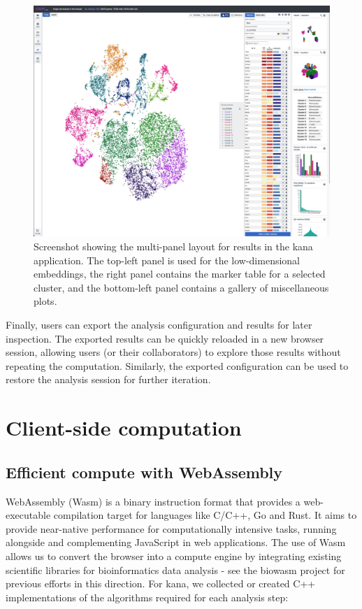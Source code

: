 \documentclass{article}
\begin{document}
\begin{figure}[htbp]
\begin{center}
\includegraphics[width=\textwidth]{screenshots/results.png}
\end{center}
\caption{Screenshot showing the multi-panel layout for results in the kana application.
The top-left panel is used for the low-dimensional embeddings,
the right panel contains the marker table for a selected cluster,
and the bottom-left panel contains a gallery of miscellaneous plots.}
\label{screenshot:results}
\end{figure}

Finally, users can export the analysis configuration and results for later inspection.
The exported results can be quickly reloaded in a new browser session, allowing users (or their collaborators) to explore those results without repeating the computation.
Similarly, the exported configuration can be used to restore the analysis session for further iteration.

\section{Client-side computation}

\subsection{Efficient compute with WebAssembly}

WebAssembly (Wasm) \cite{haas2017bringing} is a binary instruction format that provides a web-executable compilation target for languages like C/C++, Go and Rust.
It aims to provide near-native performance for computationally intensive tasks, running alongside and complementing JavaScript in web applications.
The use of Wasm allows us to convert the browser into a compute engine by integrating existing scientific libraries for bioinformatics data analysis -
see the biowasm project \cite{biowasm} for previous efforts in this direction.
For kana, we collected or created C++ implementations of the algorithms required for each analysis step:
\end{document}
